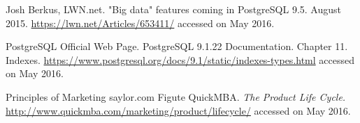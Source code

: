 \begin{thebibliography}{99999}
 Josh Berkus, LWN.net. "Big data" features coming in PostgreSQL 9.5. August 2015. \url{https://lwn.net/Articles/653411/} accessed on May 2016. 

 PostgreSQL Official Web Page. PostgreSQL 9.1.22 Documentation. Chapter 11. Indexes. \url{https://www.postgresql.org/docs/9.1/static/indexes-types.html} accessed on May 2016.

 Principles of Marketing saylor.com
 Figute 
 QuickMBA. \textit{The Product Life Cycle.} \url{http://www.quickmba.com/marketing/product/lifecycle/} accessed on May 2016.

\end{thebibliography}
